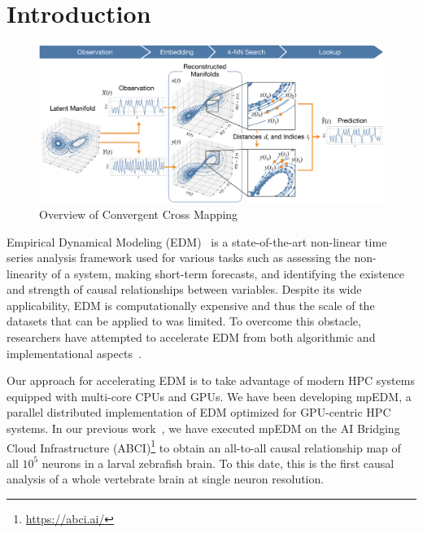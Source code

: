 \documentclass[sigconf]{acmart}
\begin{document}

\maketitle

\section{Introduction}

\begin{figure}
    \centering
    \includegraphics[width=1.0\linewidth]{figs/xmap_overview}
    \caption{Overview of Convergent Cross Mapping}%
    \label{fig:edm}
\end{figure}

Empirical Dynamical Modeling (EDM)~\cite{Chang2017} is a state-of-the-art
non-linear time series analysis framework used for various tasks such as
assessing the non-linearity of a system, making short-term forecasts, and
identifying the existence and strength of causal relationships between
variables. Despite its wide applicability, EDM is computationally expensive
and thus the scale of the datasets that can be applied to was limited. To
overcome this obstacle, researchers have attempted to accelerate EDM  from
both algorithmic and implementational aspects~\cite{Pu2019,Ma2014}.

Our approach for accelerating EDM is to take advantage of modern HPC systems
equipped with multi-core CPUs and GPUs. We have been developing mpEDM, a
parallel distributed implementation of EDM optimized for GPU-centric HPC
systems. In our previous work~\cite{mpedm}, we have executed mpEDM on
the AI Bridging Cloud Infrastructure (ABCI)\footnote{\url{https://abci.ai/}}
to obtain an all-to-all causal relationship map of all $10^5$ neurons in a
larval zebrafish brain. To this date, this is the first causal analysis of a
whole vertebrate brain at single neuron resolution.
\end{document}
